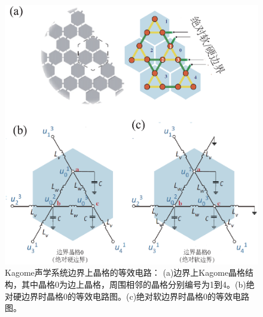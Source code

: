\begin{figure}[h!]
  \centering
  \includegraphics[width=1\textwidth]{images/fig3-3.eps} 
  \caption{Kagome声学系统边界上晶格的等效电路：
  (a)边界上Kagome晶格结构，其中晶格0为边上晶格，周围相邻的晶格分别编号为1到4。(b)绝对硬边界时晶格0的等效电路图。(c)绝对软边界时晶格0的等效电路图。
  }
  \label{fig_3_3}
\end{figure}

